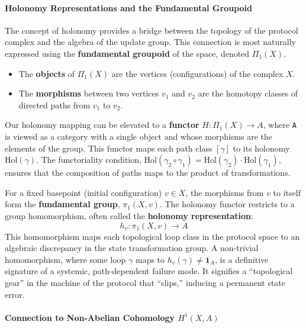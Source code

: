\documentclass[
]{article}
\providecommand{\tightlist}{%
  \setlength{\itemsep}{0pt}\setlength{\parskip}{0pt}}
\begin{document}
\paragraph{Holonomy Representations and the Fundamental
Groupoid}\label{holonomy-representations-and-the-fundamental-groupoid}

The concept of holonomy provides a bridge between the topology of the
protocol complex and the algebra of the update group. This connection is
most naturally expressed using the \textbf{fundamental groupoid} of the
space, denoted \(\Pi_1(X)\).

\begin{itemize}
\tightlist
\item
  The \textbf{objects} of \(\Pi_1(X)\) are the vertices (configurations)
  of the complex \(X\).
\item
  The \textbf{morphisms} between two vertices \(v_1\) and \(v_2\) are
  the homotopy classes of directed paths from \(v_1\) to \(v_2\).
\end{itemize}

Our holonomy mapping can be elevated to a \textbf{functor}
\(H: \Pi_1(X) \to A\), where \texttt{A} is viewed as a category with a
single object and whose morphisms are the elements of the group. This
functor maps each path class \([\gamma]\) to its holonomy
\(\text{Hol}(\gamma)\). The functoriality condition,
\(\text{Hol}(\gamma_2 \circ \gamma_1) = \text{Hol}(\gamma_2) \cdot \text{Hol}(\gamma_1)\),
ensures that the composition of paths maps to the product of
transformations.

For a fixed basepoint (initial configuration) \(v \in X\), the morphisms
from \(v\) to itself form the \textbf{fundamental group},
\(\pi_1(X, v)\). The holonomy functor restricts to a group homomorphism,
often called the \textbf{holonomy representation}:
\[ h_v: \pi_1(X, v) \to A \] This homomorphism maps each topological
loop class in the protocol space to an algebraic discrepancy in the
state transformation group. A non-trivial homomorphism, where some loop
\(\gamma\) maps to \(h_v(\gamma) \neq \mathbf{1}_A\), is a definitive
signature of a systemic, path-dependent failure mode. It signifies a
``topological gear'' in the machine of the protocol that ``slips,''
inducing a permanent state error.

\paragraph{\texorpdfstring{Connection to Non-Abelian Cohomology
\(H^1(X, A)\)}{Connection to Non-Abelian Cohomology H\^{}1(X, A)}}\label{connection-to-non-abelian-cohomology-h1x-a}
\end{document}
